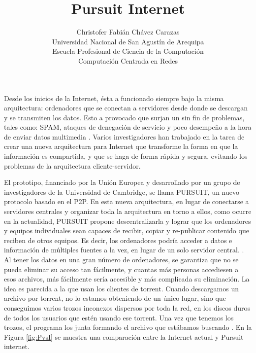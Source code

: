 \documentclass[a4paper,12pt]{article}
\begin{document}
\title{Pursuit Internet}
\author{
Christofer Fabián Chávez Carazas \\
\small{Universidad Nacional de San Agustín de Arequipa} \\
\small{Escuela Profesional de Ciencia de la Computación} \\
\small{Computación Centrada en Redes}
}
\date{}

\maketitle

Desde los inicios de la Internet, ésta a funcionado siempre bajo la misma arquitectura: ordenadores que se conectan a servidores
desde donde se descargan y se transmiten los datos. Esto a provocado que surjan un sin fin de problemas, tales como: SPAM,
ataques de denegación de servicio y poco desempeño a la hora de enviar datos multimedia \cite{pursuitPDF}. Varios investigadores
han trabajado en la tarea de crear una nueva arquitectura para Internet que transforme la forma en que la información es compartida,
y que se haga de forma rápida y segura, evitando los problemas de la arquitectura cliente-servidor. \par
El prototipo, financiado por la Unión Europea y desarrollado por un grupo de investigadores de la Universidad de Cambridge, se
llama PURSUIT, un nuevo protocolo basado en el P2P. En esta nueva arquitectura, en lugar de conectarse a servidores centrales y organizar toda la arquitectura en torno a ellos,
como ocurre en la actualidad, PURSUIT propone descentralizarla y lograr que los ordenadores y equipos individuales sean capaces de recibir, copiar y re-publicar contenido que reciben de otros equipos.
Es decir, los ordenadores podría acceder a datos e información de múltiples fuentes a la vez, en lugar de un solo servidor central. \cite{UC}.
Al tener los datos en una gran número de ordenadores, se garantiza que no se pueda eliminar su acceso tan fácilmente, y cuantas más personas accediesen a esos archivos, más fácilmente sería accesible y más complicada su eliminación.
La idea es parecida a la que usan los clientes de torrent. Cuando descargamos un archivo por torrent, no lo estamos obteniendo de un único lugar,
sino que conseguimos varios trozos inconexos dispersos por toda la red, en los discos duros de todos los usuarios que estén usando ese torrent. Una vez que tenemos los trozos,
el programa los junta formando el archivo que estábamos buscando \cite{Omi}. En la Figura \ref{fig:PvsI} se muestra una comparación
entre la Internet actual y Pursuit internet.
\end{document}
